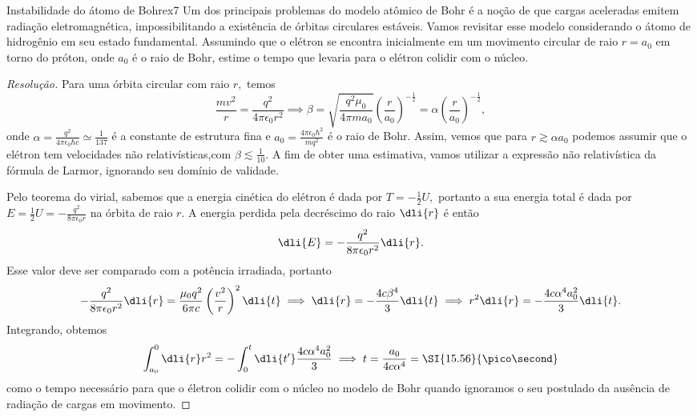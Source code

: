 \begin{exercício}{Instabilidade do átomo de Bohr}{ex7}
    Um dos principais problemas do modelo atômico de Bohr é a noção de que cargas aceleradas emitem radiação eletromagnética, impossibilitando a existência de órbitas circulares estáveis. Vamos revisitar esse modelo considerando o átomo de hidrogênio em seu estado fundamental. Assumindo que o elétron se encontra inicialmente em um movimento circular de raio \(r = a_0\) em torno do próton, onde \(a_0\) é o raio de Bohr, estime o tempo que levaria para o elétron colidir com o núcleo.
\end{exercício}
\begin{proof}[Resolução]
    Para uma órbita circular com raio \(r,\) temos
    \begin{equation*}
        \frac{m v^2}{r} = \frac{q^2}{4\pi \epsilon_0 r^2} \implies \beta = \sqrt{\frac{q^2\mu_0}{4\pi m a_0}} \left(\frac{r}{a_0}\right)^{-\frac12} = \alpha \left(\frac{r}{a_0}\right)^{-\frac12},
    \end{equation*}
    onde \(\alpha = \frac{q^2}{4\pi \epsilon_0 \hbar c} \simeq \frac1{137}\) é a constante de estrutura fina e \(a_0 = \frac{4\pi \epsilon_0 \hbar^2}{m q^2}\) é o raio de Bohr. Assim, vemos que para \(r \gtrsim \alpha a_0\) podemos assumir que o elétron tem velocidades não relativísticas,com \(\beta \lesssim \frac1{10}.\) A fim de obter uma estimativa, vamos utilizar a expressão não relativística da fórmula de Larmor, ignorando seu domínio de validade.

    Pelo teorema do virial, sabemos que a energia cinética do elétron é dada por \(T = -\frac12 U,\) portanto a sua energia total é dada por \(E = \frac12 U = -\frac{q^2}{8\pi \epsilon_0 r}\) na órbita de raio \(r.\) A energia perdida pela decréscimo do raio \(\dli{r}\) é então
    \begin{equation*}
        \dli{E} = - \frac{q^2}{8\pi \epsilon_0 r^2} \dli{r}.
    \end{equation*}
    Esse valor deve ser comparado com a potência irradiada, portanto
    \begin{equation*}
        -\frac{q^2}{8\pi \epsilon_0 r^2} \dli{r} = \frac{\mu_0 q^2}{6\pi c}\left(\frac{v^2}{r}\right)^2\dli{t} \implies \dli{r} = - \frac{4c\beta^4}{3}\dli{t} \implies r^2 \dli{r} =  -\frac{4c \alpha^4 a_0^2}{3}\dli{t}.
    \end{equation*}
    Integrando, obtemos
    \begin{equation*}
        \int_{a_0}^0 \dli{r} r^2 = -\int_0^{t} \dli{t'} \frac{4 c \alpha^4 a_0^2}{3} \implies t = \frac{a_0}{4c \alpha^4} = \SI{15.56}{\pico\second}
    \end{equation*}
    como o tempo necessário para que o életron colidir com o núcleo no modelo de Bohr quando ignoramos o seu postulado da ausência de radiação de cargas em movimento.
\end{proof}
